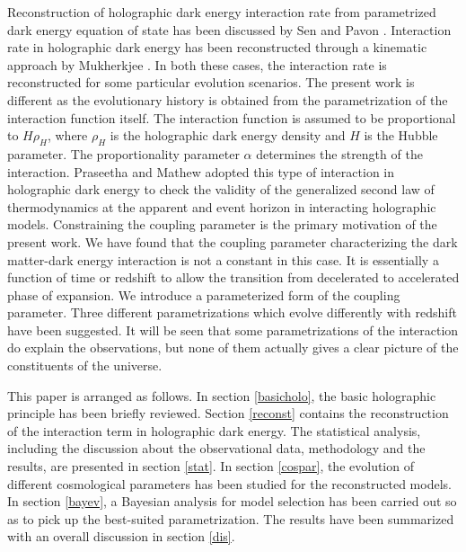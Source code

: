 \documentclass[11pt]{article}
\begin{document}
\par Reconstruction of holographic dark energy interaction rate from parametrized dark energy equation of state has been discussed by Sen and Pavon \cite{senpav}. Interaction rate in holographic dark energy has been reconstructed through a kinematic approach by Mukherkjee \cite{am}. In both these cases, the interaction rate is reconstructed for some particular evolution scenarios. The present work is different as the evolutionary history is obtained from the parametrization of the interaction function itself. The interaction function is assumed to be proportional to $H\rho_H$, where $\rho_H$ is the holographic dark energy density and $H$ is the Hubble parameter. The proportionality parameter $\alpha$ determines the strength of the interaction. Praseetha and Mathew adopted this type of interaction in holographic dark energy to check the validity of the generalized second law of thermodynamics at the apparent and event horizon \cite{praseemathew} in interacting holographic models. Constraining the coupling parameter is the primary motivation of the present work. We have found that the coupling parameter characterizing the dark matter-dark energy interaction is not a constant in this case. It is essentially a function of time or redshift to allow the transition from decelerated to accelerated phase of expansion. We introduce a parameterized form of the coupling parameter. Three different parametrizations which evolve differently with redshift have been suggested. It will be seen that some parametrizations of the interaction do explain the observations, but none of them actually gives a clear picture of the constituents of the universe.

\par  This paper is arranged as follows. In section \ref{basicholo}, the basic holographic principle has been briefly reviewed. Section \ref{reconst} contains the reconstruction of the interaction term in holographic dark energy. The statistical analysis, including the discussion about the observational data, methodology and the results, are presented in section \ref{stat}. In section \ref{cospar}, the evolution of different cosmological parameters has been studied for the reconstructed models. In section \ref{bayev}, a Bayesian analysis for model selection has been carried out so as to pick up the best-suited parametrization. The results have been summarized with an overall discussion in section \ref{dis}.
\end{document}
